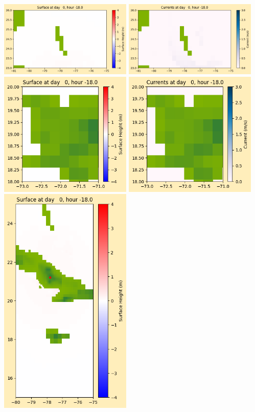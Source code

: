 \documentclass[11pt]{article}
\begin{document}
\vskip 10pt 
\includegraphics[width=0.475\textwidth]{frame0009fig1003.png}
\includegraphics[width=0.475\textwidth]{frame0009fig1004.png}
\vskip 10pt 
\includegraphics[width=0.475\textwidth]{frame0009fig1005.png}
\includegraphics[width=0.475\textwidth]{frame0009fig1006.png}
\vskip 10pt 
\includegraphics[width=0.475\textwidth]{frame0009fig1007.png}
\end{document}
